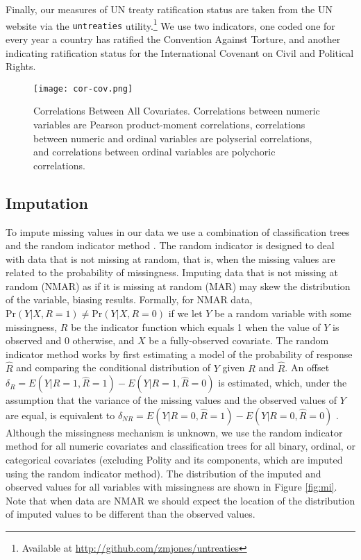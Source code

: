 \documentclass[11pt]{article}
\begin{document}
Finally, our measures of UN treaty ratification status are taken from the UN website via the {\tt untreaties} utility.\footnote{Available at \url{http://github.com/zmjones/untreaties}} We use two indicators, one coded one for every year a country has ratified the Convention Against Torture, and another indicating ratification status for the International Covenant on Civil and Political Rights. 

\begin{figure}[!htpb]
\texttt{[image: cor-cov.png]}
\caption{Correlations Between All Covariates. Correlations between numeric variables are Pearson product-moment correlations, correlations between numeric and ordinal variables are polyserial correlations, and correlations between ordinal variables are polychoric correlations.} 
\label{fig:cor-cov}
\end{figure}

\subsection{Imputation}

To impute missing values in our data we use a combination of classification trees and the random indicator method \citep{buuren2011mice,jolani2012}. The random indicator is designed to deal with data that is not missing at random, that is, when the missing values are related to the probability of missingness. Imputing data that is not missing at random (NMAR) as if it is missing at random (MAR) may skew the distribution of the variable, biasing results. Formally, for NMAR data, $\text{Pr}(Y|X, R=1) \neq \text{Pr}(Y|X, R=0)$ if we let $Y$ be a random variable with some missingness, $R$ be the indicator function which equals 1 when the value of $Y$ is observed and 0 otherwise, and $X$ be a fully-observed covariate. The random indicator method works by first estimating a model of the probability of response $\hat{R}$ and comparing the conditional distribution of $Y$ given $R$ and $\hat{R}$. An offset $\delta_R = E(Y|R=1,\hat{R}=1) - E(Y|R=1,\hat{R}=0)$ is estimated, which, under the assumption that the variance of the missing values and the observed values of $Y$ are equal, is equivalent to $\delta_{NR} = E(Y|R=0,\hat{R}=1) - E(Y|R=0,\hat{R}=0)$ \citep{jolani2012}. Although the missingness mechanism is unknown, we use the random indicator method for all numeric covariates and classification trees for all binary, ordinal, or categorical covariates (excluding Polity and its components, which are imputed using the random indicator method). The distribution of the imputed and observed values for all variables with missingness are shown in Figure \ref{fig:mi}. Note that when data are NMAR we should expect the location of the distribution of imputed values to be different than the observed values.
\end{document}

